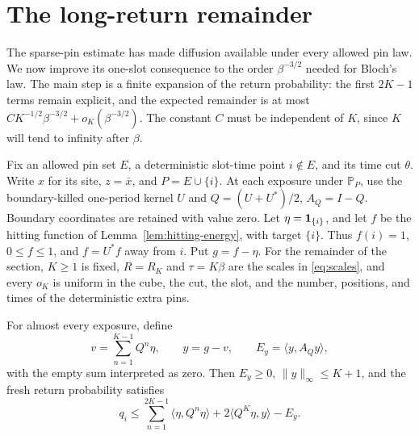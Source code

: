 \section{The long-return remainder}\label{sec:returns}

The sparse-pin estimate has made diffusion available under every allowed
pin law. We now improve its one-slot consequence to the order
\(\beta^{-3/2}\) needed for Bloch's law. The main step is a finite
expansion of the return probability: the first \(2K-1\) terms remain
explicit, and the expected remainder is at most
\(C K^{-1/2}\beta^{-3/2}+o_K(\beta^{-3/2})\). The constant \(C\)
must be independent of \(K\), since \(K\) will tend to infinity after
\(\beta\).

Fix an allowed pin set \(E\), a deterministic slot-time point
\(i\notin E\), and its time cut \(\theta\). Write \(x\) for its site,
\(z=\bar x\), and \(P=E\cup\{i\}\). At each exposure under
\(\mathbb P_P\), use the boundary-killed one-period kernel \(U\) and
\(Q=(U+U^*)/2\), \(A_Q=I-Q\). Boundary coordinates are retained with
value zero. Let \(\eta=\mathbf1_{\{i\}}\), and let \(f\) be the hitting
function of Lemma~\ref{lem:hitting-energy}, with target \(\{i\}\).
Thus \(f(i)=1\), \(0\le f\le1\), and \(f=U^*f\) away from \(i\).
Put \(g=f-\eta\). For the remainder of the section, \(K\ge1\) is
fixed, \(R=R_K\) and \(\tau=K\beta\) are the scales in
\eqref{eq:scales}, and every \(o_K\) is uniform in the cube, the cut,
the slot, and the number, positions, and times of the deterministic
extra pins.

\begin{lemma}\label{lem:return-expansion}
For almost every exposure, define
\[
 v=\sum_{n=1}^{K-1}Q^n\eta,\qquad y=g-v,\qquad
 E_y=\langle y,A_Qy\rangle,
\]
with the empty sum interpreted as zero. Then \(E_y\ge0\),
\(\|y\|_\infty\le K+1\), and the fresh return probability satisfies
\begin{equation}\label{eq:return-expansion}
 q_i\le\sum_{n=1}^{2K-1}\langle\eta,Q^n\eta\rangle
          +2\langle Q^K\eta,y\rangle-E_y .
\end{equation}
\end{lemma}

